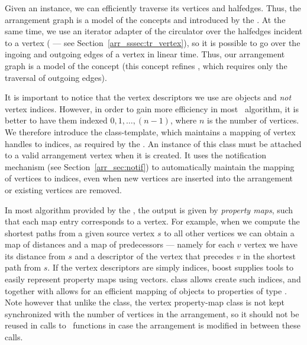 Given an  instance, we can efficiently traverse its
vertices and halfedges. Thus, the arrangement graph is a model of the concepts
 and  introduced by the \bgl.
At the same time, we use an iterator adapter of the circulator over the
halfedges incident to a vertex ( --- see
Section~\ref{arr_sssec:tr_vertex}), so it is possible to go over the ingoing
and outgoing edges of a vertex in linear time. Thus, our arrangement graph
is a model of the concept  (this concept refines
, which requires only the traversal of outgoing edges).

It is important to notice that the vertex descriptors we use are
 objects and {\em not} vertex indices. However, in order
to gain more efficiency in most \bgl\ algorithm, it is better to have them
indexed $0, 1, \ldots, (n-1)$, where $n$ is the number of vertices. We
therefore introduce the  class-template,
which maintains a mapping of vertex handles to indices, as required by the
\bgl. An instance of this class must be attached to a valid arrangement
vertex when it is created. It uses the notification mechanism (see
Section~\ref{arr_sec:notif}) to automatically maintain the mapping of vertices
to indices, even when new vertices are inserted into the arrangement or
existing vertices are removed.

In most algorithm provided by the \bgl, the output is given by
{\em property maps}, such that each map entry corresponds to a vertex.
For example, when we compute the shortest paths from a given source vertex
$s$ to all other vertices we can obtain a map of distances and a map of
predecessors --- namely for each $v$ vertex we have its distance from $s$
and a descriptor of the vertex that precedes $v$ in the shortest path from $s$.
If the vertex descriptors are simply indices, boost supplies tools to
easily represent property maps using vectors.
 class allows create such
indices, and together with  allows for
an efficient mapping of  objects to
properties of type . Note however that unlike the
 class, the vertex property-map class is not
kept synchronized with the number of vertices in the arrangement, so it
should not be reused in calls to \bgl\ functions in case the arrangement
is modified in between these calls.

